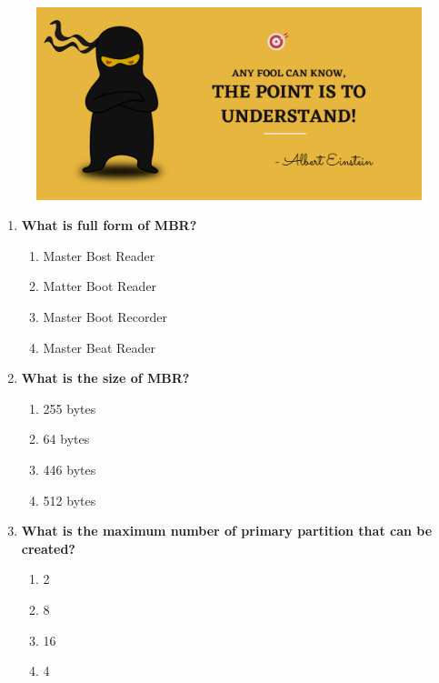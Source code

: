 \setlength{\columnsep}{3pt}
\begin{flushleft}
	
	\paragraph{}
	\bigskip
	
	\begin{figure}[h!]
		\centering
		\includegraphics[scale=.2]{content/practise.jpg}
	\end{figure}	
	\begin{enumerate}
		
		\item \textbf{What is full form of MBR?}
		\begin{enumerate}[label=(\alph*)]
			\item Master Bost Reader
			\item Matter Boot Reader
			\item Master Boot Recorder %
			\item Master Beat Reader
		\end{enumerate}
		\bigskip
		\bigskip
		
		\item \textbf{What is the size of MBR?}
		\begin{enumerate}[label=(\alph*)]
			\item 255 bytes
			\item 64 bytes 
			\item 446 bytes 
			\item 512 bytes %
		\end{enumerate}
		\bigskip
		\bigskip	
		
		\item \textbf{What is the maximum number of primary partition that can be created?}
		\begin{enumerate}[label=(\alph*)]
			\item 2
			\item 8
			\item 16
			\item 4 %
		\end{enumerate}
		\bigskip
		\bigskip	


\end{enumerate}
\end{flushleft}
